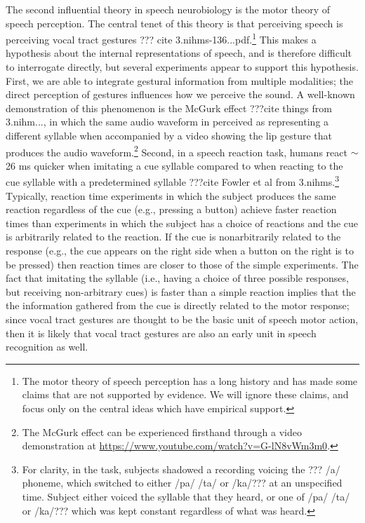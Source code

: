 The second influential theory
in speech neurobiology is the
motor theory of speech perception.
The central tenet of this theory
is that perceiving speech
is perceiving vocal tract gestures
??? cite 3.nihms-136...pdf.\footnote{
  The motor theory of speech perception has a long history
  and has made some claims that are not supported by evidence.
  We will ignore these claims, and focus only on
  the central ideas which have empirical support.}
This makes a hypothesis about
the internal representations of speech,
and is therefore difficult
to interrogate directly,
but several experiments appear
to support this hypothesis.
First, we are able to integrate
gestural information from multiple modalities;
the direct perception of gestures
influences how we perceive the sound.
A well-known demonstration of
this phenomenon is the McGurk effect
???cite things from 3.nihm...,
in which the same audio waveform
in perceived as representing a different syllable
when accompanied by a video
showing the lip gesture that produces
the audio waveform.\footnote{
  The McGurk effect can be experienced firsthand through
  a video demonstration at
  \url{https://www.youtube.com/watch?v=G-lN8vWm3m0}.}
Second, in a speech reaction task,
humans react $\sim$26 ms quicker
when imitating a cue syllable
compared to when reacting
to the cue syllable
with a predetermined syllable
???cite Fowler et al from 3.nihms.\footnote{
  For clarity, in the task, subjects
  shadowed a recording voicing the ??? /a/ phoneme,
  which switched to either /pa/ /ta/ or /ka/??? at an
  unspecified time.
  Subject either voiced the syllable that they heard,
  or one of /pa/ /ta/ or /ka/??? which was
  kept constant regardless of what was heard.}
Typically, reaction time experiments
in which the subject produces the same reaction
regardless of the cue (e.g., pressing a button)
achieve faster reaction times
than experiments in which the subject
has a choice of reactions
and the cue is arbitrarily related
to the reaction.
If the cue is nonarbitrarily related
to the response
(e.g., the cue appears on the right side
when a button on the right is to be pressed)
then reaction times are closer to those
of the simple experiments.
The fact that imitating the syllable
(i.e., having a choice of three possible responses,
but receiving non-arbitrary cues)
is faster than a simple reaction
implies that the the information gathered
from the cue is directly related
to the motor response;
since vocal tract gestures are thought
to be the basic unit of speech motor action,
then it is likely that vocal tract gestures
are also an early unit
in speech recognition as well.

